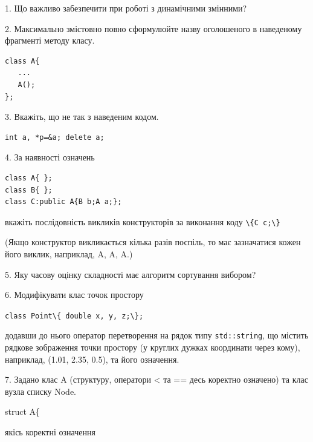 \documentclass[12pt, ukrainian]{article}
\def\code#1{\Verb!#1!}
\begin{document}
{%
1. Що важливо забезпечити при роботі з динамічними змінними?%
\par
\vspace{2mm}
2. Максимально змістовно повно сформулюйте назву оголошеного в наведеному фрагменті методу класу.
\vspace{-3mm}
\begin{verbatim}class A{
   ...
   A();
};\end{verbatim}
\vspace{-3mm}
\par
\vspace{2mm}
3. Вкажіть, що не так з наведеним кодом.
\vspace{-3mm}
\begin{verbatim}int a, *p=&a; delete a;\end{verbatim}
\vspace{-3mm}
\par
\vspace{2mm}
4. За наявності означень
\vspace{-3mm}
\begin{verbatim}
class A{ };
class B{ };
class C:public A{B b;A a;};\end{verbatim}
\vspace{-3mm}
вкажіть послідовність викликів конструкторів за виконання коду \code{\{C c;\}} 

(Якщо конструктор викликається кілька разів поспіль, то має зазначатися кожен його виклик, наприклад, A, A, A.)

\vspace{2mm}
5. Яку часову оцінку складності має алгоритм сортування вибором?
\par
\vspace{2mm}
6. Модифікувати клас точок простору 

\qquad\code{class Point\{ double x, y, z;\};}


додавши до нього оператор перетворення на рядок типу \code{std::string}, що містить рядкове зображення точки простору (у круглих дужках координати через кому), наприклад, (1.01, 2.35, 0.5), та його означення.%
\par
\vspace{2mm}
7. 
Задано клас A (структуру, оператори < та == десь коректно означено) та клас вузла списку Node.

struct A\{

\quad  якісь коректні означення 

}
\end{document}

